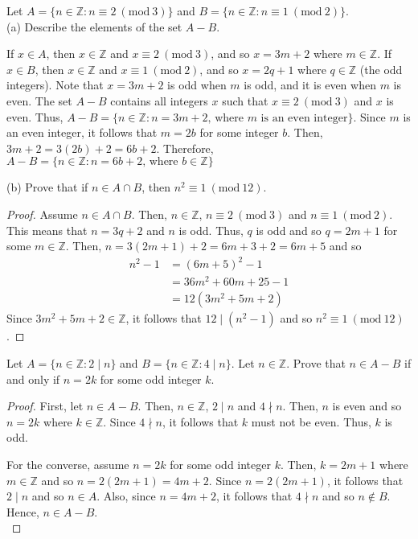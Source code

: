 \documentclass[12pt]{article}
\newcommand{\Z}{\mathbb{Z}}
\newcommand{\Mod}[1]{\ (\mathrm{mod}\ #1)}
\newenvironment{problem}[2][Problem]{\begin{trivlist}
		\item[\hskip \labelsep {\bfseries #1}\hskip \labelsep {\bfseries #2.}]}{\end{trivlist}}
\newenvironment{solution}[2][Solution]{\begin{trivlist}
		\item[\hskip \labelsep {\bfseries #1}\hskip \labelsep {\bfseries #2.}]}{\end{trivlist}}
\begin{document}
	\begin{problem}{47}
		Let $A=\{n\in \Z: n\equiv 2 \Mod 3\}$ and $B=\{n\in\Z : n\equiv 1 \Mod 2\}$.\\
		(a) Describe the elements of the set $A-B$.
		\begin{solution}{a}
			If $x\in A$, then $x\in \Z$ and $x \equiv 2 \Mod 3$, and so $x = 3m +2$ where $m\in \Z$. If $x\in B$, then $x\in \Z$ and $x\equiv 1 \Mod 2$, and so $x = 2q +1$ where $q\in \Z$ (the odd integers). Note that $x = 3m+2$ is odd when $m$ is odd, and it is even when $m$ is even. The set $A-B$ contains all integers $x$ such that $x\equiv 2 \Mod 3$ and $x$ is even. Thus, $A-B = \{n\in \Z: n = 3m+2 \text{, where }m \text{ is an even integer}\}$. Since $m$ is an even integer, it follows that $m = 2b$ for some integer $b$. Then, $3m+2 = 3(2b) +2 = 6b +2$. Therefore, $A-B = \{n\in \Z: n = 6b+2 \text{, where }b\in \Z\}$
		\end{solution}
		(b) Prove that if $n\in A\cap B$, then $n^{2} \equiv 1 \Mod {12}$.
		\begin{proof}
			  Assume $n\in A\cap B$. Then, $n\in \Z$, $n\equiv 2 \Mod 3$ and $n \equiv 1 \Mod 2$. This means that $n = 3q+2$ and $n$ is odd. Thus, $q$ is odd and so $q = 2m +1$ for some $m\in \Z$. Then, $n = 3(2m+1)+2 = 6m+3+2= 6m+5$ and so
			  \begin{align*}
			  	n^{2}-1 &= (6m+5)^{2}-1\\
			  	 &= 36m^{2}+60m+25-1\\
			  	 &= 12(3m^{2}+5m+2)
			  \end{align*}
		  	Since $3m^{2}+5m+2\in \Z$, it follows that $12\mid (n^{2}-1)$ and so $n^{2}\equiv 1 \Mod {12}$.
		\end{proof}
	\end{problem}
	
	\begin{problem}{48}
		Let $A=\{n\in \Z:2\mid n\}$ and  $B=\{n\in\Z:4\mid n\}$. Let $n\in \Z$. Prove that $n\in A-B$ if and only if $n=2k$ for some odd integer $k$.
		\begin{proof}
			First, let $n\in A-B$. Then, $n\in \Z$, $2\mid n$ and $4\nmid n$. Then, $n$ is even and so $n = 2k$ where $k\in \Z$. Since $4\nmid n$, it follows that $k$ must not be even. Thus, $k$ is odd.
			
			For the converse, assume $n=2k$ for some odd integer $k$. Then, $k = 2m+1$ where $m\in \Z$ and so $n=2(2m+1) = 4m+2$. Since $n = 2(2m+1)$, it follows that $2\mid n$ and so $n\in A$. Also, since $n = 4m+2$, it follows that $4\nmid n$ and so $n\not\in B$. Hence, $n\in A-B$.\\
		\end{proof}
	\end{problem}
\end{document}
